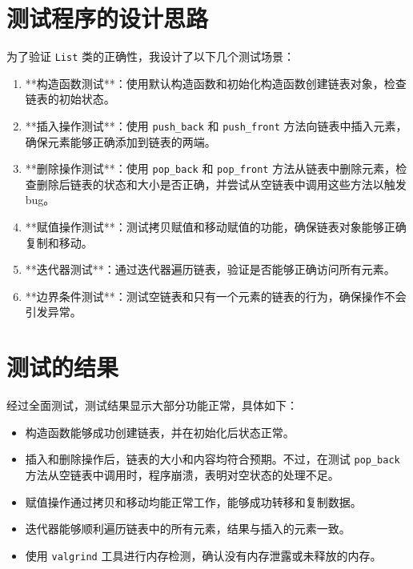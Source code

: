 \documentclass[UTF8]{ctexart}
\begin{document}
\pagestyle{fancy}
\fancyhead{}

\section{测试程序的设计思路}

为了验证 \texttt{List} 类的正确性，我设计了以下几个测试场景：

\begin{enumerate}[label=\arabic*.]
    \item **构造函数测试**：使用默认构造函数和初始化构造函数创建链表对象，检查链表的初始状态。
    \item **插入操作测试**：使用 \texttt{push\_back} 和 \texttt{push\_front} 方法向链表中插入元素，确保元素能够正确添加到链表的两端。
    \item **删除操作测试**：使用 \texttt{pop\_back} 和 \texttt{pop\_front} 方法从链表中删除元素，检查删除后链表的状态和大小是否正确，并尝试从空链表中调用这些方法以触发 bug。
    \item **赋值操作测试**：测试拷贝赋值和移动赋值的功能，确保链表对象能够正确复制和移动。
    \item **迭代器测试**：通过迭代器遍历链表，验证是否能够正确访问所有元素。
    \item **边界条件测试**：测试空链表和只有一个元素的链表的行为，确保操作不会引发异常。
\end{enumerate}

\section{测试的结果}

经过全面测试，测试结果显示大部分功能正常，具体如下：

\begin{itemize}
    \item 构造函数能够成功创建链表，并在初始化后状态正常。
    \item 插入和删除操作后，链表的大小和内容均符合预期。不过，在测试 \texttt{pop\_back} 方法从空链表中调用时，程序崩溃，表明对空状态的处理不足。
    \item 赋值操作通过拷贝和移动均能正常工作，能够成功转移和复制数据。
    \item 迭代器能够顺利遍历链表中的所有元素，结果与插入的元素一致。
    \item 使用 \texttt{valgrind} 工具进行内存检测，确认没有内存泄露或未释放的内存。
\end{itemize}
\end{document}
